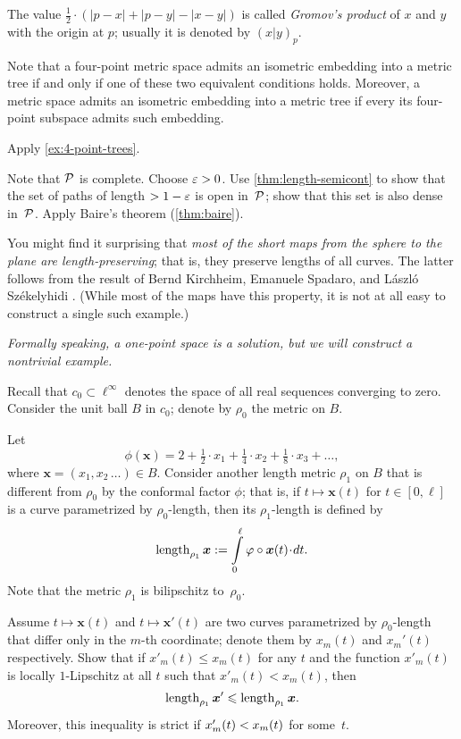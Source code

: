 The value $\tfrac12\cdot(|p-x|+|p-y|-|x-y|)$ is called \emph{Gromov's product} of $x$ and $y$ with the origin at $p$;
usually it is denoted by $(x|y)_p$.

Note that a four-point metric space admits an isometric embedding into a metric tree if and only if one of these two equivalent conditions holds.
Moreover, a metric space admits an isometric embedding into a metric tree if every its four-point subspace admits such embedding.


Apply \ref{ex:4-point-trees}.

Note that $\mathcal{P}$ is complete.
Choose $\varepsilon>0$.
Use \ref{thm:length-semicont} to show that the set of paths of length $>1-\varepsilon$ is open in~$\mathcal{P}$;
show that this set is also dense in~$\mathcal{P}$.
Apply Baire's theorem (\ref{thm:baire}).

You might find it surprising that \textit{most of the short maps from the sphere to the plane are \emph{length-preserving}}; that is, they preserve lengths of all curves.
The latter follows from the result of 
Bernd Kirchheim, 
Emanuele Spadaro,
and 
L{\'a}szl{\'o} Sz{\'e}kelyhidi \cite{KSS}.
(While most of the maps have this property, it is not at all easy to construct a single such example.) 


\textit{Formally speaking, a one-point space is a solution,
but we will construct a nontrivial example.}

Recall that $c_0\subset\ell^\infty$ denotes the space of all real sequences converging to zero.
Consider the unit ball $B$ in $c_0$;
denote by $\rho_0$ the metric on $B$.

Let \[\phi(\bm{x})=2+\tfrac{1}2\cdot x_1+\tfrac{1}4\cdot x_2+\tfrac{1}8\cdot x_3+\dots,\]
where $\bm{x}=(x_1,x_2\,\dots)\in B$.
Consider another length metric $\rho_1$ on $B$ that is different from $\rho_0$ by the conformal factor $\phi$;
that is, if $t\mapsto\bm{x}(t)$ for $t\in[0,\ell]$ is a curve parametrized by $\rho_0$-length,
then its $\rho_1$-length is defined by
\[\length_{\rho_1}\bm{x}\df\int\limits_0^\ell\phi\circ\bm{x}(t)\cdot dt.\]
Note that the metric $\rho_1$ is bilipschitz to~$\rho_0$.

Assume $t\mapsto \bm{x}(t)$ and $t\mapsto \bm{x}'(t)$ are two curves parametrized by $\rho_0$-length that differ only in the $m$-th coordinate; denote them by $x_m(t)$ and $x_m'(t)$ respectively.
Show that if $x'_m(t)\le x_m(t)$ for any $t$ and 
the function $x'_m(t)$ is locally $1$-Lipschitz at all $t$ such that $x'_m(t)< x_m(t)$, then 
\[\mathop{\rm length}\nolimits_{\rho_1}\bm{x}'\leqslant \mathop{\rm length}\nolimits_{\rho_1}\bm{x}.\]
Moreover, this inequality is strict if $x'_m(t)\z< x_m(t)$ for some~$t$.

